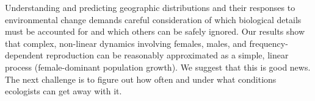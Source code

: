 \documentclass[11pt]{article}\usepackage[]{graphicx}\usepackage[]{color}
\begin{document}
Understanding and predicting geographic distributions and their responses to environmental change demands careful consideration of which biological details must be accounted for and which others can be safely ignored. 
Our results show that complex, non-linear dynamics involving females, males, and frequency-dependent reproduction can be reasonably approximated as a simple, linear process (female-dominant population growth).
We suggest that this is good news. 
The next challenge is to figure out how often and under what conditions ecologists can get away with it. 




\end{document}
